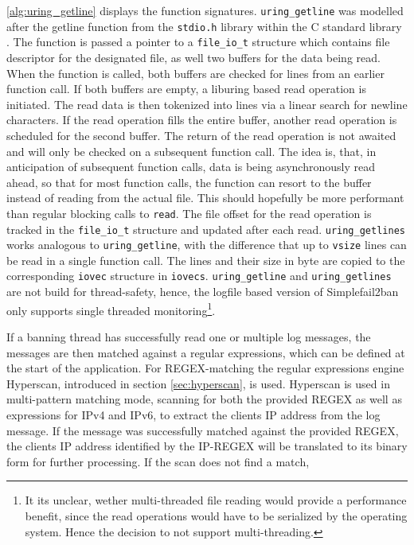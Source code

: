 \ref{alg:uring_getline} displays the function signatures. \texttt{uring\_getline} was modelled after the getline function
from the \texttt{stdio.h} library within the C standard library \cite{getline}. The function is passed a pointer to a \texttt{file\_io\_t} structure   
which contains file descriptor for the designated file, as well two buffers for the data being read. When the function is called, both buffers are checked for lines from an earlier function call.
If both buffers are empty, a liburing based read operation
is initiated. The read data is then tokenized into lines via a linear search for newline characters. If the read operation fills the entire buffer, another read
operation is scheduled for the second buffer. The return of the read operation is not awaited and will only be checked on a subsequent function call. The idea is,
that, in anticipation of subsequent function calls, data is being asynchronously read ahead, so that for most function calls, the function can resort to the buffer instead
of reading from the actual file. This should hopefully be more performant than regular blocking calls to \texttt{read}. The file offset for the read operation is tracked in
the \texttt{file\_io\_t} structure and updated after each read. \texttt{uring\_getlines} works analogous to \texttt{uring\_getline}, with the difference that up to \texttt{vsize}
lines can be read in a single function call. The lines and their size in byte are copied to the corresponding \texttt{iovec} structure in \texttt{iovecs}.
\texttt{uring\_getline} and \texttt{uring\_getlines} are not build for thread-safety, hence, the logfile based version of Simplefail2ban only supports single threaded monitoring\footnote{It its unclear, wether multi-threaded file reading would provide a performance benefit, since the read operations would have to be serialized by the operating system. Hence the decision to not support multi-threading.}.
\par
If a banning thread has successfully read one or multiple log messages, the messages are then matched against a regular expressions, which can be defined at the start of the application.
For \ac{REGEX}-matching the regular expressions engine Hyperscan, introduced in section \ref{sec:hyperscan}, is used. Hyperscan is used in multi-pattern matching mode, scanning
for both the provided \ac{REGEX} as well as expressions for \ac{IPv4} and \ac{IPv6}, to extract the clients \ac{IP} address from the log message. If the message was successfully matched against
the provided \ac{REGEX}, the clients \ac{IP} address identified by the \ac{IP}-\ac{REGEX} will be translated to its binary form for further processing. If the scan does not find a match, 
